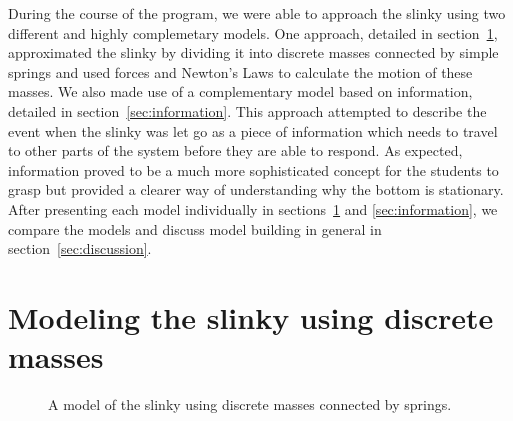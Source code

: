 \documentclass[prb,preprint,superscriptaddress]{revtex4-1}
\renewcommand{\sec}[1]{section~\ref{sec:#1}}
\newcommand{\secs}[2]{sections~\ref{sec:#1} and \ref{sec:#2}}
\begin{document}
During the course of the program, we were able to approach the slinky using two different
and highly complemetary models.
One approach, detailed in \sec{forces}, approximated
the slinky by dividing it into discrete masses connected by simple springs and used
forces and Newton's Laws to calculate the motion of these masses.
We also made use of a complementary
model based on information, detailed in \sec{information}. This approach attempted
to describe the event when the slinky was let go as a piece of information which
needs to travel to other parts of the system before they are able to respond.
As expected, information proved to be a much more sophisticated concept for the
students to grasp but provided a clearer way of understanding why the bottom
is stationary. After presenting each
model individually in \secs{forces}{information}, we compare the models and
discuss model building in general in \sec{discussion}.

\section{Modeling the slinky using discrete masses}
\label{sec:forces}

\begin{figure}[t]
\centering


\caption{A model of the slinky using discrete masses connected by springs.}
\label{fig:discrete}
\end{figure}
\end{document}
